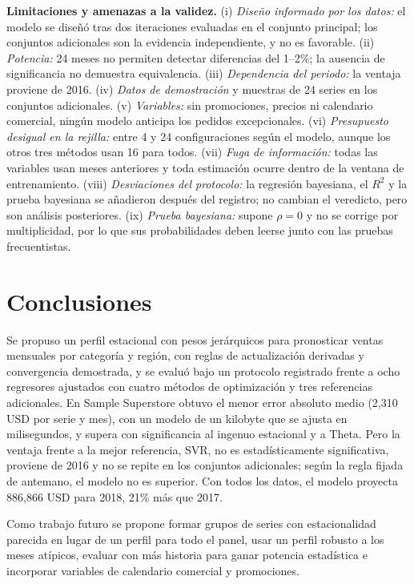 \documentclass[pdflatex,sn-mathphys-num]{sn-jnl}
\theoremstyle{thmstyleone}
\begin{document}
\textbf{Limitaciones y amenazas a la validez.} (i) \emph{Diseño informado por los datos:} el modelo se diseñó tras dos iteraciones evaluadas en el conjunto principal; los conjuntos adicionales son la evidencia independiente, y no es favorable. (ii) \emph{Potencia:} 24 meses no permiten detectar diferencias del 1--2\%; la ausencia de significancia no demuestra equivalencia. (iii) \emph{Dependencia del periodo:} la ventaja proviene de 2016. (iv) \emph{Datos de demostración} y muestras de 24 series en los conjuntos adicionales. (v) \emph{Variables:} sin promociones, precios ni calendario comercial, ningún modelo anticipa los pedidos excepcionales. (vi) \emph{Presupuesto desigual en la rejilla:} entre 4 y 24 configuraciones según el modelo, aunque los otros tres métodos usan 16 para todos. (vii) \emph{Fuga de información:} todas las variables usan meses anteriores y toda estimación ocurre dentro de la ventana de entrenamiento. (viii) \emph{Desviaciones del protocolo:} la regresión bayesiana, el $R^2$ y la prueba bayesiana se añadieron después del registro; no cambian el veredicto, pero son análisis posteriores. (ix) \emph{Prueba bayesiana:} supone $\rho=0$ y no se corrige por multiplicidad, por lo que sus probabilidades deben leerse junto con las pruebas frecuentistas.

\section{Conclusiones}\label{sec:conclusiones}

Se propuso un perfil estacional con pesos jerárquicos para pronosticar ventas mensuales por categoría y región, con reglas de actualización derivadas y convergencia demostrada, y se evaluó bajo un protocolo registrado frente a ocho regresores ajustados con cuatro métodos de optimización y tres referencias adicionales. En Sample Superstore obtuvo el menor error absoluto medio (2{,}310 USD por serie y mes), con un modelo de un kilobyte que se ajusta en milisegundos, y supera con significancia al ingenuo estacional y a Theta. Pero la ventaja frente a la mejor referencia, SVR, no es estadísticamente significativa, proviene de 2016 y no se repite en los conjuntos adicionales; según la regla fijada de antemano, el modelo no es superior. Con todos los datos, el modelo proyecta 886{,}866 USD para 2018, 21\% más que 2017.

Como trabajo futuro se propone formar grupos de series con estacionalidad parecida en lugar de un perfil para todo el panel, usar un perfil robusto a los meses atípicos, evaluar con más historia para ganar potencia estadística e incorporar variables de calendario comercial y promociones.
\end{document}
